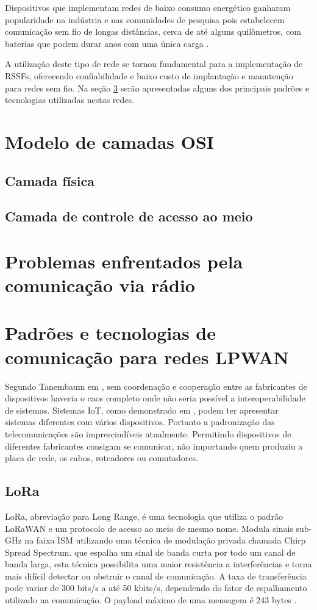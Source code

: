 Dispositivos que implementam redes de baixo consumo energético ganharam popularidade na indústria e nas comunidades de pesquisa pois estabelecem comunicação sem fio de longas distâncias, cerca de até alguns quilômetros, com baterias que podem durar anos com uma única carga \cite{mekki2019comparative}.

A utilização deste tipo de rede se tornou fundamental para a implementação de RSSFs, oferecendo confiabilidade e baixo custo de implantação e manutenção para redes sem fio. Na seção \ref{padrõesSF} serão apresentadas alguns dos principais padrões e tecnologias utilizadas nestas redes.

\section{Modelo de camadas OSI}
\label{osi}
\subsection{Camada física}
\subsection{Camada de controle de acesso ao meio}

\section{Problemas enfrentados pela comunicação via rádio}


\section{Padrões e tecnologias de comunicação para redes LPWAN}
\label{padrõesSF}
Segundo Tanembaum em \cite{tanembaum2011}, sem coordenação e cooperação entre as fabricantes de dispositivos haveria o caos completo onde não seria possível a interoperabilidade de sistemas. Sistemas IoT, como demonstrado em \cite{sotres2017practical}, podem ter apresentar sistemas diferentes com vários dispositivos. Portanto a padronização das telecomunicações são imprescindíveis atualmente. Permitindo dispositivos de diferentes fabricantes consigam se comunicar, não importando quem produziu a placa de rede, os cabos, roteadores ou comutadores.

\subsection{LoRa}
LoRa, abreviação para Long Range, é uma tecnologia que utiliza o padrão LoRaWAN e um protocolo de acesso ao meio de mesmo nome. Modula sinais sub-GHz na faixa ISM utilizando uma técnica de modulação  privada chamada Chirp Spread Spectrum. que espalha um sinal de banda curta por todo um canal de banda larga, esta técnica possibilita uma maior resistência a interferências e torna mais difícil detectar ou obstruir o canal de comunicação. A taxa de transferência pode variar de 300 bits/s a até 50 kbits/s, dependendo do fator de espalhamento utilizado na comunicação. O payload máximo de uma mensagem é 243 bytes \cite{mekki2019comparative}.


